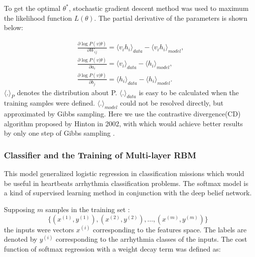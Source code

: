 \documentclass[graybox]{svmult}
\begin{document}
To get the optimal $\theta^*$, stochastic gradient descent\cite{Leon} method was used to maximum the likelihood function $L(\theta)$. The partial derivative of the parameters is shown below:

\begin{equation}
\begin{split}
&\frac{\partial\log P(v|\theta)}{\partial W_{ij}} = \langle v_i h_i \rangle_{data} -\langle v_i h_i \rangle_{model},\\
&\frac{\partial\log P(v|\theta)}{\partial a_{i}} = \langle v_i \rangle_{data} -\langle h_i \rangle_{model},\\
&\frac{\partial\log P(v|\theta)}{\partial b_{j}} = \langle h_i \rangle_{data} -\langle h_i \rangle_{model}.
\end{split}
\end{equation}
$\langle . \rangle_P$ denotes the distribution about P. $\langle . \rangle_{data}$ is easy to be calculated when the training samples were defined. $\langle . \rangle_{model}$ could not be resolved directly, but approximated by Gibbs sampling. Here we use the contrastive divergence(CD)\cite{Hinton02} algorithm proposed by Hinton in 2002, with which would achieve better results by only one step of Gibbs sampling .

\subsubsection{Classifier and the Training of Multi-layer RBM}
This model generalized logistic regression \cite{Peng} in classification missions which would be useful in heartbeats arrhythmia classification problems. The softmax model is a kind of supervised learning method in conjunction with the deep belief network.

Supposing $m$ samples in the training set :
\begin{equation}
\{(x^{(1)},y^{(1)}), (x^{(2)},y^{(2)}), \ldots, (x^{(m)},y^{(m)}) \}
\end{equation}
the inputs were vectors $x^{(i)}$ corresponding to the features space. The labels are denoted by $y^{(i)}$  corresponding to the arrhythmia classes of the inputs.
The cost function of softmax regression with a weight decay term was defined as:
\end{document}
